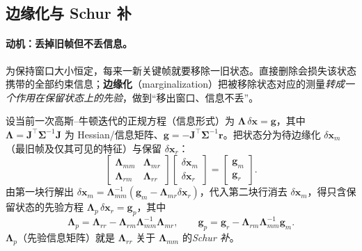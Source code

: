 \subsection{边缘化与 Schur 补}
\label{sec:vio-marg}

\paragraph{动机：丢掉旧帧但不丢信息。}
为保持窗口大小恒定，每来一新关键帧就要移除一旧状态。直接删除会损失该状态携带的全部约束信息；\textbf{边缘化}（marginalization）把被移除状态对应的测量\emph{转成一个作用在保留状态上的先验}，做到“移出窗口、信息不丢”\cite{qin2018vins,sibley2010sliding}。

\begin{theorem}\label{thm:vio-schur}
设当前一次高斯--牛顿迭代的正规方程（信息形式）为 $\boldsymbol{\Lambda}\,\delta\mathbf{x}=\mathbf{g}$，其中 $\boldsymbol{\Lambda}=\mathbf{J}^\top\boldsymbol{\Sigma}^{-1}\mathbf{J}$ 为 Hessian/信息矩阵、$\mathbf{g}=-\mathbf{J}^\top\boldsymbol{\Sigma}^{-1}\mathbf{r}$。把状态分为待边缘化 $\delta\mathbf{x}_m$（最旧帧及仅其可见的特征）与保留 $\delta\mathbf{x}_r$：
\begin{equation}
  \begin{bmatrix}\boldsymbol{\Lambda}_{mm}&\boldsymbol{\Lambda}_{mr}\\ \boldsymbol{\Lambda}_{rm}&\boldsymbol{\Lambda}_{rr}\end{bmatrix}
  \begin{bmatrix}\delta\mathbf{x}_m\\ \delta\mathbf{x}_r\end{bmatrix}
  =\begin{bmatrix}\mathbf{g}_m\\ \mathbf{g}_r\end{bmatrix}.
  \label{eq:vio-marg-block}
\end{equation}
由第一块行解出 $\delta\mathbf{x}_m=\boldsymbol{\Lambda}_{mm}^{-1}(\mathbf{g}_m-\boldsymbol{\Lambda}_{mr}\delta\mathbf{x}_r)$，代入第二块行消去 $\delta\mathbf{x}_m$，得只含保留状态的先验方程 $\boldsymbol{\Lambda}_p\,\delta\mathbf{x}_r=\mathbf{g}_p$，其中
\begin{equation}
  \boldsymbol{\Lambda}_p=\boldsymbol{\Lambda}_{rr}-\boldsymbol{\Lambda}_{rm}\boldsymbol{\Lambda}_{mm}^{-1}\boldsymbol{\Lambda}_{mr},
  \qquad
  \mathbf{g}_p=\mathbf{g}_r-\boldsymbol{\Lambda}_{rm}\boldsymbol{\Lambda}_{mm}^{-1}\mathbf{g}_m.
  \label{eq:vio-schur}
\end{equation}
$\boldsymbol{\Lambda}_p$（先验信息矩阵）就是 $\boldsymbol{\Lambda}_{rr}$ 关于 $\boldsymbol{\Lambda}_{mm}$ 的\emph{Schur 补}。
\end{theorem}

